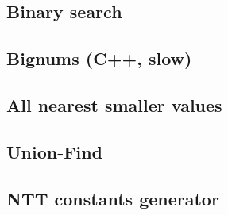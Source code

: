 \documentclass[9pt]{extarticle}
\begin{document}
\begin{multicols*}{3}
\subsection{Binary search} %


\subsection{Bignums (C++, slow)} %


\subsection{All nearest smaller values} %


\subsection{Union-Find}


\subsection{NTT constants generator}



\end{multicols*}
\end{document}
